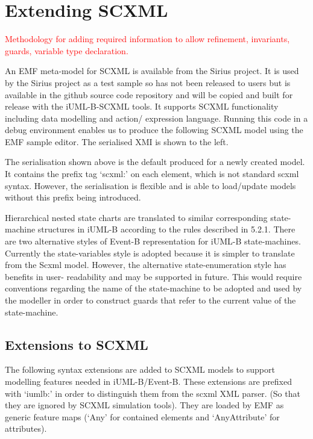 
\section{Extending SCXML}
\label{sect:extension}

\textcolor{red}{Methodology for adding required information to allow refinement, invariants,
guards, variable type declaration.}

An EMF meta-model for SCXML is available from the Sirius 
project. It is used by the Sirius project as a test sample 
so has not been released to users but is available in the 
github source code repository and will be copied and built 
for release with the iUML-B-SCXML tools. It supports SCXML 
functionality including data modelling and action/
expression language. 
Running this code in a debug environment enables us to 
produce the following SCXML model using the EMF sample 
editor. The serialised XMI is shown to the left. 

The serialisation shown above is the default produced for a 
newly created model. It contains the prefix tag ‘scxml:’ on 
each element, which is not standard scxml syntax. However, 
the serialisation is flexible and is able to load/update 
models without this prefix being introduced.

Hierarchical nested state charts are translated to similar 
corresponding state-machine structures in iUML-B according 
to the rules described in 5.2.1. There are two alternative 
styles of Event-B representation for iUML-B state-machines. 
Currently the state-variables style is adopted because it 
is simpler to translate from the Scxml model. However, the 
alternative state-enumeration style has benefits in user-
readability and may be supported in future. This would 
require conventions regarding the name of the state-machine 
to be adopted and used by the modeller in order to 
construct guards that refer to the current value of the 
state-machine.

\subsection{Extensions to SCXML}
\label{sect:extension-to-SCXML}

The following syntax extensions are added to SCXML models 
to support modelling features needed in iUML-B/Event-B. 
These extensions are prefixed with ‘iumlb:’ in order to 
distinguish them from the scxml XML parser. (So that they 
are ignored by SCXML simulation tools). They are loaded by 
EMF as generic feature maps (‘Any’ for contained elements 
and ‘AnyAttribute’ for attributes).

